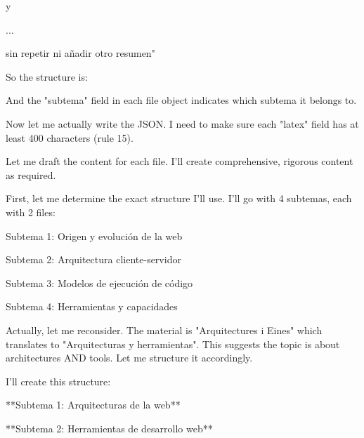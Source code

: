 
y 

...

sin repetir \secciongrande ni añadir otro resumen"

So the structure is:

And the "subtema" field in each file object indicates which subtema it belongs to.

Now let me actually write the JSON. I need to make sure each "latex" field has at least 400 characters (rule 15).

Let me draft the content for each file. I'll create comprehensive, rigorous content as required.

First, let me determine the exact structure I'll use. I'll go with 4 subtemas, each with 2 files:

Subtema 1: Origen y evolución de la web

Subtema 2: Arquitectura cliente-servidor

Subtema 3: Modelos de ejecución de código

Subtema 4: Herramientas y capacidades

Actually, let me reconsider. The material is "Arquitectures i Eines" which translates to "Arquitecturas y herramientas". This suggests the topic is about architectures AND tools. Let me structure it accordingly.

I'll create this structure:

**Subtema 1: Arquitecturas de la web**

**Subtema 2: Herramientas de desarrollo web**

